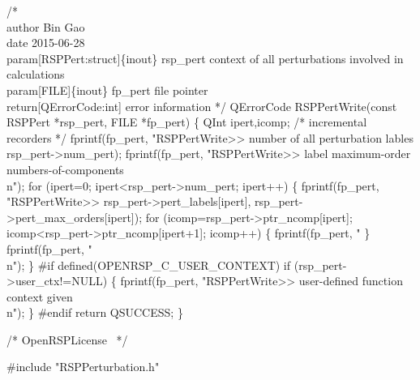 /*%
    \\author Bin Gao
    \\date 2015-06-28
    \\param[RSPPert:struct]\{inout\} rsp_pert context of all perturbations involved in calculations
    \\param[FILE]\{inout\} fp_pert file pointer
    \\return[QErrorCode:int] error information
*/
QErrorCode RSPPertWrite(const RSPPert *rsp_pert, FILE *fp_pert)
\{
    QInt ipert,icomp;  /* incremental recorders */
    fprintf(fp_pert,
            "RSPPertWrite>> number of all perturbation lables %
            rsp_pert->num_pert);
    fprintf(fp_pert,
            "RSPPertWrite>> label           maximum-order    numbers-of-components\\n");
    for (ipert=0; ipert<rsp_pert->num_pert; ipert++) \{
        fprintf(fp_pert,
                "RSPPertWrite>>  %
                rsp_pert->pert_labels[ipert],
                rsp_pert->pert_max_orders[ipert]);
        for (icomp=rsp_pert->ptr_ncomp[ipert]; icomp<rsp_pert->ptr_ncomp[ipert+1]; icomp++) \{
            fprintf(fp_pert, " %
        \}
        fprintf(fp_pert, "\\n");
    \}
#if defined(OPENRSP_C_USER_CONTEXT)
    if (rsp_pert->user_ctx!=NULL) \{
        fprintf(fp_pert, "RSPPertWrite>> user-defined function context given\\n");
    \}
#endif
    return QSUCCESS;
\}

\nwendcode{}\endmoddef
/*
  \LA{}OpenRSPLicense~{\nwtagstyle{}}\RA{}
*/

#include "RSPPerturbation.h"

